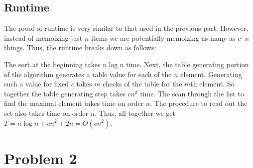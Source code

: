 \documentclass{article}
\begin{document}
\subsection{Runtime}
The proof of runtime is very similar to that used in the previous part. However, instead of memoizing just $n$ items we are potentially memoizing as many as $c \cdot n$ things. Thus, the runtime breaks down as follows:

The sort at the beginning takes $n\log{n}$ time. Next, the table generating portion of the algorithm generates a table value for each of the $n$ element. Generating such a value for fixed $c$ takes $m$ checks of the table for the $m$th element. So together the table generating step takes $c n^2$ time. The scan through the list to find the maximal element takes time on order $n$. The procedure to read out the set also takes time on order $n$. Thus, all together we get $T= n\log{n}+c n^2+2n =O(c n^2)$.

\section{Problem 2}
\end{document}
